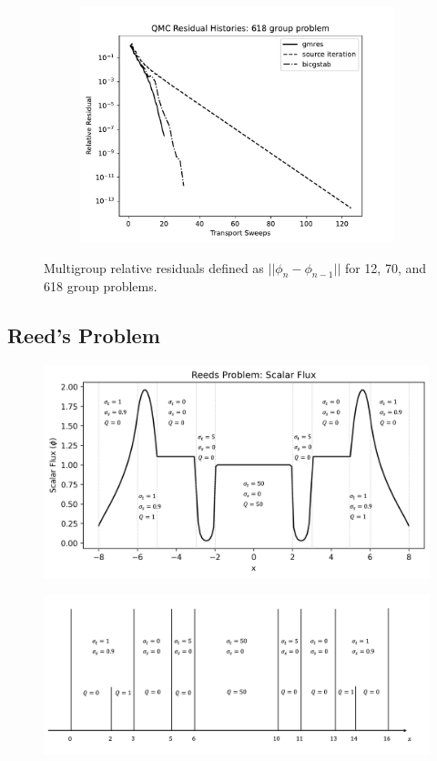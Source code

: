 \begin{figure}
\begin{subfigure}[b]{0.45\textwidth}
         \centering
         \includegraphics[width=\textwidth]{FIGURES/618Group.pdf}
         \caption{\label{fig:12group}}
     \end{subfigure}
        \caption{Multigroup relative residuals defined as $||\phi_n - \phi_{n-1}||$ for 12, 70, and 618 group problems.}
        \label{fig:multigroup}
\end{figure}


\subsection{Reed's Problem}

\begin{figure}[h]
\centerline{
\includegraphics[width=5.5in]{FIGURES/Reeds_problem2.png}
}
\caption{\label{fig:reeds}}
\end{figure}

\begin{figure}[h]
\centerline{
\includegraphics[width=5.0in]{FIGURES/Reeds_problem.png}
}
\caption{\label{fig:reeds}}
\end{figure}